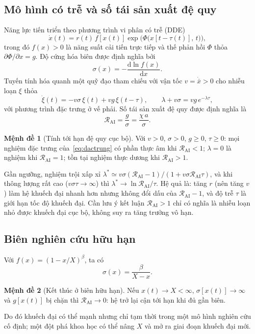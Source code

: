 \documentclass[12pt,a4paper,openany]{report}
\numberwithin{equation}{chapter}   %
\theoremstyle{definition}
\newtheorem{menhde}{Mệnh đề}[chapter]
\newcommand{\RAI}{\mathcal{R}_{\mathrm{AI}}}
\newcommand{\dd}{\mathrm{d}}
\begin{document}
\subsection{Mô hình có trễ và số tái sản xuất đệ quy}
Năng lực tiến triển theo phương trình vi phân có trễ (DDE)
\begin{equation}
  \dot{x}(t) = r(t)\, f\!\left[x(t)\right] \exp\!\Big(\Phi\big(x[t-\tau(t)],\,t\big)\Big),
  \label{eq:chinh}
\end{equation}
trong đó $f(x)>0$ là năng suất cải tiến trực tiếp và thế phản hồi $\Phi$ thỏa $\partial\Phi/\partial x=g$. Độ cứng hóa biên được định nghĩa bởi
\begin{equation}
  \sigma(x) = -\frac{\dd \ln f(x)}{\dd x}.
  \label{eq:sigma}
\end{equation}
Tuyến tính hóa quanh một quỹ đạo tham chiếu với vận tốc $v=\dot{\bar{x}}>0$ cho nhiễu loạn $\xi$ thỏa
\begin{equation}
  \dot{\xi}(t) = -v\sigma\,\xi(t) + v g\,\xi(t-\tau),
  \qquad \lambda + v\sigma = v g\, e^{-\lambda\tau},
  \label{eq:dactrung}
\end{equation}
với phương trình đặc trưng ở vế phải. Số tái sản xuất đệ quy được định nghĩa là
\begin{equation}
  \RAI = \frac{g}{\sigma} = \frac{\chi\, a}{\sigma}.
  \label{eq:rai}
\end{equation}

\begin{menhde}[Tính tới hạn đệ quy cục bộ]\label{mh:1}
Với $v>0$, $\sigma>0$, $g\ge 0$, $\tau\ge 0$: mọi nghiệm đặc trưng của~\eqref{eq:dactrung} có phần thực âm khi $\RAI<1$; $\lambda=0$ là nghiệm khi $\RAI=1$; tồn tại nghiệm thực dương khi $\RAI>1$.
\end{menhde}
Gần ngưỡng, nghiệm trội xấp xỉ $\lambda^{*}\simeq v\sigma(\RAI-1)/(1+v\sigma\RAI\tau)$, và khi thông lượng rất cao ($v\sigma\tau\to\infty$) thì $\lambda^{*}\to \ln\RAI/\tau$. Hệ quả là: tăng $r$ (nên tăng $v$) làm hệ khuếch đại nhanh hơn nhưng không đổi dấu của $\RAI-1$, và độ trễ $\tau$ là giới hạn tốc độ khuếch đại. Cần lưu ý kết luận $\RAI>1$ chỉ có nghĩa là nhiễu loạn nhỏ được khuếch đại cục bộ, không suy ra tăng trưởng vô hạn.

\subsection{Biên nghiên cứu hữu hạn}
Với $f(x)=(1-x/X)^{\beta}$, ta có
\begin{equation}
  \sigma(x)=\frac{\beta}{X-x}.
  \label{eq:bienhuuhan}
\end{equation}
\begin{menhde}[Kết thúc ở biên hữu hạn]\label{mh:2}
Nếu $x(t)\to X<\infty$, $\sigma[x(t)]\to\infty$ và $g[x(t)]$ bị chặn thì $\RAI\to 0$: hệ trở lại cận tới hạn khi đủ gần biên.
\end{menhde}
Do đó khuếch đại có thể mạnh nhưng chỉ tạm thời trong một mô hình nghiên cứu cố định; một đột phá khoa học có thể nâng $X$ và mở ra giai đoạn khuếch đại mới.
\end{document}
